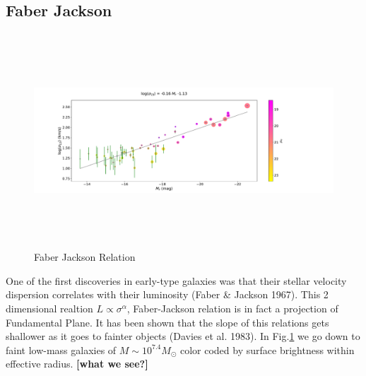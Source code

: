 \documentclass{aa}
\begin{document}
\subsection{Faber Jackson}
\begin{figure}[!htb]
   \centering
   \includegraphics[width=37cm,height=8cm,keepaspectratio]
   {../2_pipeline/2_FJ/Faber_Jackson_x-axis=M_r.pdf}
         \caption{Faber Jackson Relation}
         \label{fig:FJ}
\end{figure}
One of the first discoveries in early-type galaxies was that their stellar velocity dispersion correlates with their luminosity (Faber \& Jackson 1967). This 2 dimensional realtion $L\propto\sigma^\alpha$, Faber-Jackson relation is in fact a projection
 of Fundamental Plane. It has been shown that the slope of this relations gets shallower as it goes to fainter objects (Davies et al. 1983). In Fig.\ref{fig:FJ} we go down to faint low-mass galaxies of $M\sim 10^{7.4}M_\odot$ color coded by surface brightness within effective radius. \textbf{[what we see?]}\\

\end{document}
